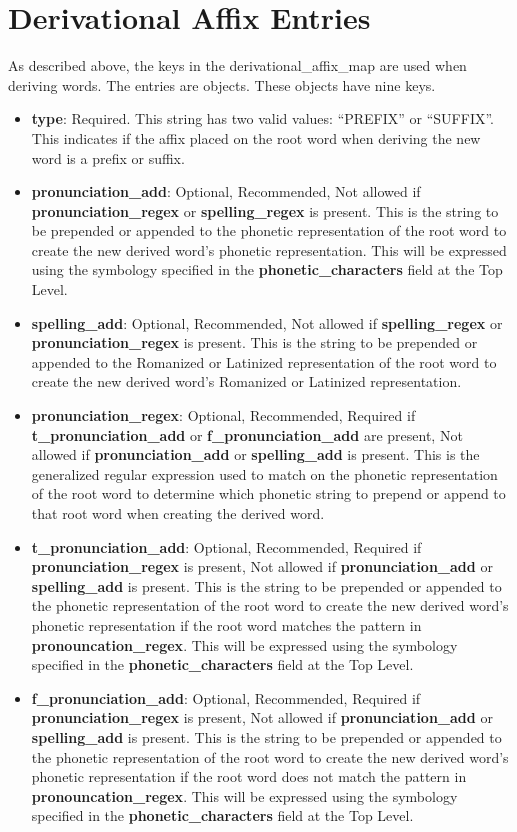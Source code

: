 \chapter{Derivational Affix Entries}
As described above, the keys in the derivational\_affix\_map are used when deriving words.  The entries are objects.  These objects have nine keys.
\begin{itemize}
	\item \textbf{type}: Required.  This string has two valid values: ``PREFIX'' or ``SUFFIX''.  This indicates if the affix placed on the root word when deriving the new word is a prefix or suffix.
	\item \textbf{pronunciation\_add}: Optional, Recommended, Not allowed if \textbf{pronunciation\_regex} or \textbf{spelling\_regex} is present.  This is the string to be prepended or appended to the phonetic representation of the root word to create the new derived word's phonetic representation.   This will be expressed using the symbology specified in the \textbf{phonetic\_characters} field at the Top Level.
	\item \textbf{spelling\_add}: Optional, Recommended, Not allowed if \textbf{spelling\_regex} or \textbf{pronunciation\_regex} is present.  This is the string to be prepended or appended to the Romanized or Latinized representation of the root word to create the new derived word's Romanized or Latinized representation.
	\item \textbf{pronunciation\_regex}: Optional, Recommended, Required if \textbf{t\_pronunciation\_add} or \textbf{f\_pronunciation\_add} are present, Not allowed if \textbf{pronunciation\_add} or \textbf{spelling\_add} is present.  This is the generalized regular expression used to match on the phonetic representation of the root word to determine which phonetic string to prepend or append to that root word when creating the derived word.
	\item \textbf{t\_pronunciation\_add}: Optional, Recommended, Required if \textbf{pronunciation\_regex} is present, Not allowed if \textbf{pronunciation\_add} or \textbf{spelling\_add} is present.  This is the string to be prepended or appended to the phonetic representation of the root word to create the new derived word's phonetic representation if the root word matches the pattern in \textbf{pronouncation\_regex}.  This will be expressed using the symbology specified in the \textbf{phonetic\_characters} field at the Top Level.
	\item \textbf{f\_pronunciation\_add}: Optional, Recommended, Required if \textbf{pronunciation\_regex} is present, Not allowed if \textbf{pronunciation\_add} or \textbf{spelling\_add} is present.  This is the string to be prepended or appended to the phonetic representation of the root word to create the new derived word's phonetic representation if the root word does not match the pattern in \textbf{pronouncation\_regex}.  This will be expressed using the symbology specified in the \textbf{phonetic\_characters} field at the Top Level.

\end{itemize}
